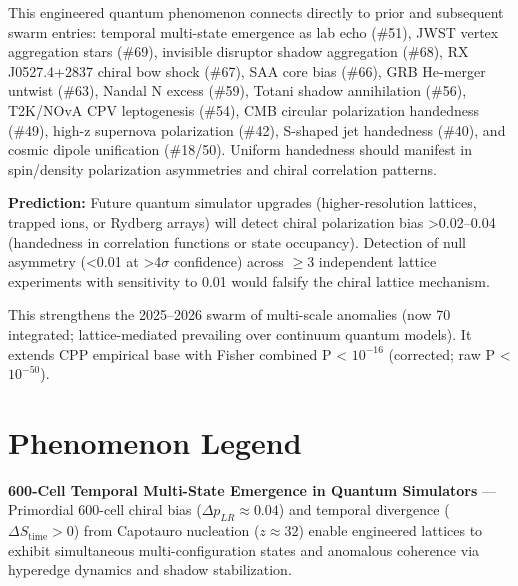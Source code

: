 \documentclass[11pt]{article}
\begin{document}
This engineered quantum phenomenon connects directly to prior and subsequent swarm entries: temporal multi-state emergence as lab echo (\#51), JWST vertex aggregation stars (\#69), invisible disruptor shadow aggregation (\#68), RX J0527.4+2837 chiral bow shock (\#67), SAA core bias (\#66), GRB He-merger untwist (\#63), Nandal N excess (\#59), Totani shadow annihilation (\#56), T2K/NOvA CPV leptogenesis (\#54), CMB circular polarization handedness (\#49), high-z supernova polarization (\#42), S-shaped jet handedness (\#40), and cosmic dipole unification (\#18/50). Uniform handedness should manifest in spin/density polarization asymmetries and chiral correlation patterns.

\textbf{Prediction:} Future quantum simulator upgrades (higher-resolution lattices, trapped ions, or Rydberg arrays) will detect chiral polarization bias >0.02--0.04 (handedness in correlation functions or state occupancy). Detection of null asymmetry (<0.01 at >4$\sigma$ confidence) across $\geq 3$ independent lattice experiments with sensitivity to 0.01 would falsify the chiral lattice mechanism.

This strengthens the 2025--2026 swarm of multi-scale anomalies (now 70 integrated; lattice-mediated prevailing over continuum quantum models). It extends CPP empirical base with Fisher combined P < $10^{-16}$ (corrected; raw P < $10^{-50}$).

\section{Phenomenon Legend}
\textbf{600-Cell Temporal Multi-State Emergence in Quantum Simulators} — Primordial 600-cell chiral bias ($\Delta p_{LR} \approx 0.04$) and temporal divergence ($\Delta S_{\text{time}} > 0$) from Capotauro nucleation ($z \approx 32$) enable engineered lattices to exhibit simultaneous multi-configuration states and anomalous coherence via hyperedge dynamics and shadow stabilization.
\end{document}
